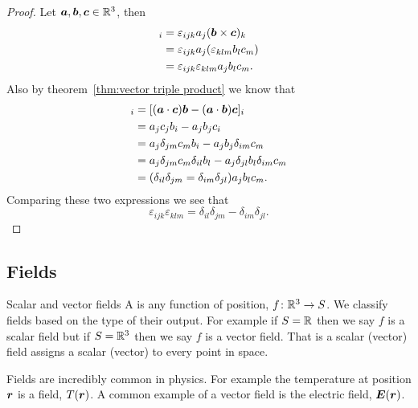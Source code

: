 \begin{proof}
    Let \(\bm{a}, \bm{b}, \bm{c}\in\mathbb{R}^3\), then
    \begin{align*}
        [\vv{a}\times(\vv{b}\times\vv{c})]_i &= \varepsilon_{ijk}a_j(\vv{b}\times\vv{c})_k\\
        &= \varepsilon_{ijk}a_j(\varepsilon_{klm}b_lc_m)\\
        &= \varepsilon_{ijk}\varepsilon_{klm}a_jb_lc_m.
    \end{align*}
    Also by theorem~\ref{thm:vector triple product} we know that
    \begin{align*}
        [\vv{a}\times(\vv{b}\times\vv{c})]_i &= [(\vv{a}\cdot\vv{c})\vv{b} - (\vv{a}\cdot\vv{b})\vv{c}]_i\\
        &= a_jc_jb_i - a_jb_jc_i\\
        &= a_j\delta_{jm}c_mb_i - a_jb_j\delta_{im}c_m\\
        &= a_j\delta_{jm}c_m\delta_{il}b_l - a_j\delta_{jl}b_l\delta_{im}c_m\\
        &= (\delta_{il}\delta_{jm} = \delta_{im}\delta_{jl})a_jb_lc_m.
    \end{align*}
    Comparing these two expressions we see that
    \[\varepsilon_{ijk}\varepsilon_{klm} = \delta_{il}\delta_{jm} - \delta_{im}\delta_{jl}.\]
\end{proof}

\subsection{Fields}
\begin{definition}{Scalar and vector fields}{}
    A  is any function of position, \(f\colon\mathbb{R}^3\to S\).
    We classify fields based on the type of their output.
    For example if \(S = \mathbb{R}\) then we say \(f\) is a scalar field but if \(S = \mathbb{R}^3\) then we say \(f\) is a vector field.
    That is a scalar (vector) field assigns a scalar (vector) to every point in space.
\end{definition}
Fields are incredibly common in physics.
For example the temperature at position \(\bm{r}\) is a field, \(T(\bm{r})\).
A common example of a vector field is the electric field, \(\bm{E}(\bm{r})\).

